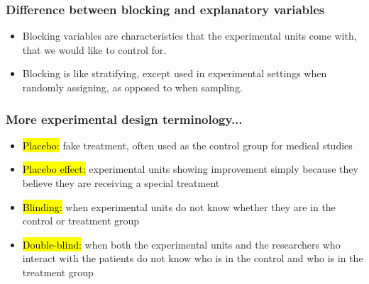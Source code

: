 \documentclass[slidestop,compress,mathserif]{beamer}
\begin{document}


\begin{frame}
	\frametitle{Difference between blocking and explanatory variables}

	\begin{itemize}
		\item Blocking variables are characteristics that the experimental units come with, that we would like to control for.
		\item Blocking is like stratifying, except used in experimental settings when randomly assigning, as opposed to when sampling.
	\end{itemize}

\end{frame}


\begin{frame}
	\frametitle{More experimental design terminology...}

	\begin{itemize}
		\item \hl{Placebo:} fake treatment, often used as the control group for medical studies
		\item \hl{Placebo effect:} experimental units showing improvement simply because they believe they are receiving a special treatment
		\item \hl{Blinding:} when experimental units do not know whether they are in the control or treatment group
		\item \hl{Double-blind:} when both the experimental units and the researchers who interact with the patients do not know who is in the control and who is in the treatment group

	\end{itemize}

\end{frame}




\end{document}
